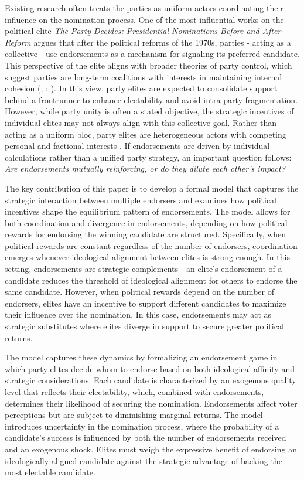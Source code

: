 Existing research often treats the parties as uniform actors coordinating their influence on the nomination process. One of the most influential works on the political elite \textit{The Party Decides: Presidential Nominations Before and After Reform} \parencite{Cohen2008} argues that after the political reforms of the 1970s, parties - acting as a collective - use endorsements as a mechanism for signaling its preferred candidate. This perspective of the elite aligns with broader theories of party control, which suggest parties are long-term coalitions with interests in maintaining internal cohesion (\cite{aldrich1995}; \cite{aldrich2011}; \cite{Bawn2012}). In this view, party elites are expected to consolidate support behind a frontrunner to enhance electability and avoid intra-party fragmentation. However, while party unity is often a stated objective, the strategic incentives of individual elites may not always align with this collective goal. Rather than acting as a uniform bloc, party elites are heterogeneous actors with competing personal and factional interests \parencite{Noel2014}. If endorsements are driven by individual calculations rather than a unified party strategy, an important question follows: \textit{Are endorsements mutually reinforcing, or do they dilute each other’s impact?}

The key contribution of this paper is to develop a formal model that captures the strategic interaction between multiple endorsers and examines how political incentives shape the equilibrium pattern of endorsements. The model allows for both coordination and divergence in endorsements, depending on how political rewards for endorsing the winning candidate are structured.  Specifically, when political rewards are constant regardless of the number of endorsers, coordination emerges whenever ideological alignment between elites is strong enough. In this setting, endorsements are strategic complements—an elite’s endorsement of a candidate reduces the threshold of ideological alignment for others to endorse the same candidate. However, when political rewards depend on the number of endorsers, elites have an incentive to support different candidates to maximize their influence over the nomination. In this case, endorsements may act as strategic substitutes where elites diverge in support to secure greater political returns.

The model captures these dynamics by formalizing an endorsement game in which party elites decide whom to endorse based on both ideological affinity and strategic considerations. Each candidate is characterized by an exogenous quality level that reflects their electability, which, combined with endorsements, determines their likelihood of securing the nomination. Endorsements affect voter perceptions but are subject to diminishing marginal returns. The model introduces uncertainty in the nomination process, where the probability of a candidate’s success is influenced by both the number of endorsements received and an exogenous shock. Elites must weigh the expressive benefit of endorsing an ideologically aligned candidate against the strategic advantage of backing the most electable candidate.

